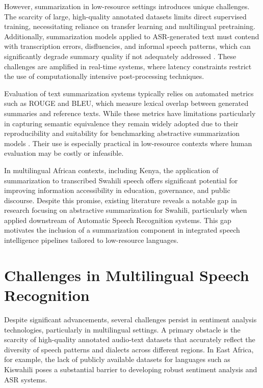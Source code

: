 However, summarization in low-resource settings introduces unique challenges. The scarcity of large, high-quality annotated datasets limits direct supervised training, necessitating reliance on transfer learning and multilingual pretraining. Additionally, summarization models applied to ASR-generated text must contend with transcription errors, disfluencies, and informal speech patterns, which can significantly degrade summary quality if not adequately addressed \cite{huang2021leveraging}. These challenges are amplified in real-time systems, where latency constraints restrict the use of computationally intensive post-processing techniques.

Evaluation of text summarization systems typically relies on automated metrics such as ROUGE and BLEU, which measure lexical overlap between generated summaries and reference texts. While these metrics have limitations particularly in capturing semantic equivalence they remain widely adopted due to their reproducibility and suitability for benchmarking abstractive summarization models \cite{lin2004rouge,papineni2002bleu}. Their use is especially practical in low-resource contexts where human evaluation may be costly or infeasible.

In multilingual African contexts, including Kenya, the application of summarization to transcribed Swahili speech offers significant potential for improving information accessibility in education, governance, and public discourse. Despite this promise, existing literature reveals a notable gap in research focusing on abstractive summarization for Swahili, particularly when applied downstream of Automatic Speech Recognition systems. This gap motivates the inclusion of a summarization component in integrated speech intelligence pipelines tailored to low-resource languages.


\section{Challenges in Multilingual Speech Recognition}
Despite significant advancements, several challenges persist in sentiment analysis technologies, particularly in multilingual settings. A primary obstacle is the scarcity of high-quality annotated audio-text datasets that accurately reflect the diversity of speech patterns and dialects across different regions. In East Africa, for example, the lack of publicly available datasets for languages such as Kiswahili poses a substantial barrier to developing robust sentiment analysis and ASR systems.

